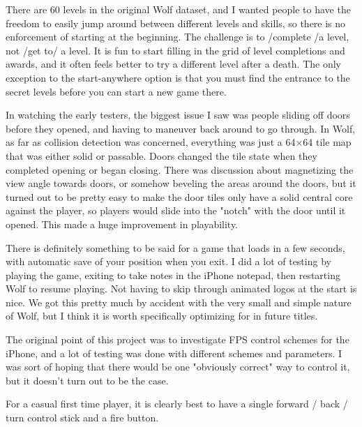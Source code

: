 \documentclass[book.tex]{subfiles}
\begin{document}
There are 60 levels in the original Wolf dataset, and I wanted people to have the freedom to easily jump around between different levels and skills, so there is no enforcement of starting at the beginning.  The challenge is to /complete /a level, not /get to/ a level.  It is fun to start filling in the grid of level completions and awards, and it often feels better to try a different level after a death.  The only exception to the start-anywhere option is that you must find the entrance to the secret levels before you can start a new game there.\\
\par

In watching the early testers, the biggest issue I saw was people sliding off doors before they opened, and having to maneuver back around to go through.  In Wolf, as far as collision detection was concerned, everything was just a 64×64 tile map that was either solid or passable.
Doors changed the tile state when they completed opening or began closing.  There was discussion about magnetizing the view angle towards doors, or somehow beveling the areas around the doors, but it turned out to be pretty easy to make the door tiles only have a solid central core against the player, so players would slide into the "notch" with the door until it opened.  This made a huge improvement in playability.\\
\par

There is definitely something to be said for a game that loads in a few seconds, with automatic save of your position when you exit.  I did a lot of testing by playing the game, exiting to take notes in the iPhone notepad, then restarting Wolf to resume playing.  Not having to skip through animated logos at the start is nice.  We got this pretty much by accident with the very small and simple nature of Wolf, but I think it is worth specifically optimizing for in future titles.\\
\par

The original point of this project was to investigate FPS control schemes for the iPhone, and a lot of testing was done with different schemes and parameters.  I was sort of hoping that there would be one "obviously correct" way to control it, but it doesn't turn out to be the case.\\
\par

For a casual first time player, it is clearly best to have a single forward / back / turn control stick and a fire button.\\
\par
\end{document}
